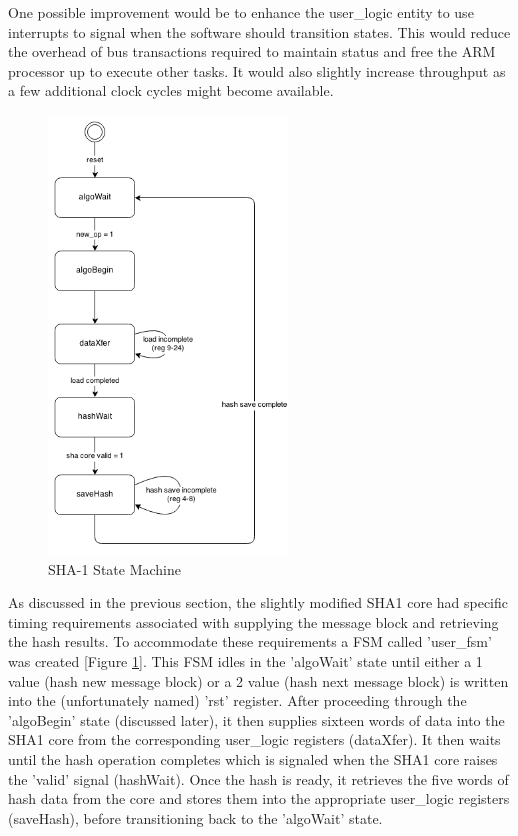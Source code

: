\documentclass[journal]{IEEEtran}
\begin{document}
One possible improvement would be to enhance the user\_logic entity to use interrupts to signal when the software should transition states.  This would reduce the overhead of bus transactions required to maintain status and free the ARM processor up to execute other tasks.  It would also slightly increase throughput as a few additional clock cycles might become available.
\begin{figure}[ht]
\centering
\includegraphics[width=2.5in]{UserLogicStateDiagram.png}
\caption{SHA-1 State Machine}
\label{fig_algoFSM}
\end{figure}

As discussed in the previous section, the slightly modified SHA1 core had specific timing requirements associated with supplying the message block and retrieving the hash results.  To accommodate these requirements a FSM called 'user\_fsm' was created [Figure \ref{fig_algoFSM}].   This FSM idles in the 'algoWait' state until either a 1 value (hash new message block) or a 2 value (hash next message block) is written into the (unfortunately named) 'rst' register.  After proceeding through the 'algoBegin' state (discussed later), it then supplies sixteen words of data into the SHA1 core from the corresponding user\_logic registers (dataXfer).  It then waits until the hash operation completes which is signaled when the SHA1 core raises the 'valid' signal (hashWait).  Once the hash is ready, it retrieves the five words of hash data from the core and stores them into the appropriate user\_logic registers (saveHash), before transitioning back to the 'algoWait' state.
\end{document}
